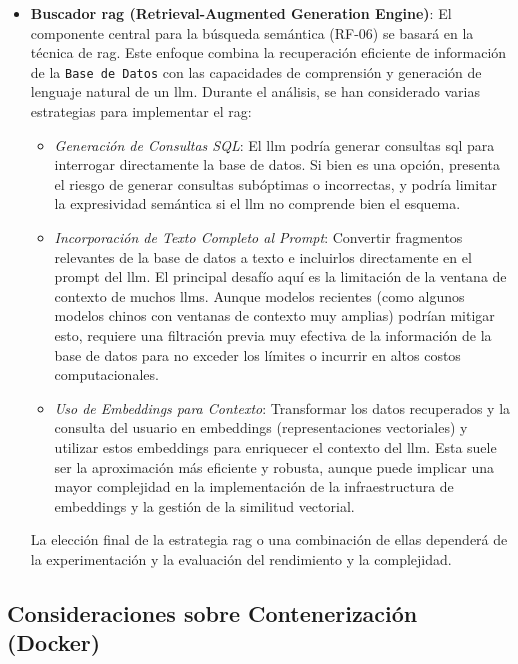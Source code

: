 \begin{itemize}
    \item \textbf{Buscador \gls{rag} (Retrieval-Augmented Generation Engine)}:
    El componente central para la búsqueda semántica (RF-06) se basará en la técnica de \gls{rag}. Este enfoque combina la recuperación eficiente de información de la \texttt{Base de Datos} con las capacidades de comprensión y generación de lenguaje natural de un \gls{llm}. Durante el análisis, se han considerado varias estrategias para implementar el \gls{rag}:
    \begin{itemize}
        \item \textit{Generación de Consultas SQL}: El \gls{llm} podría generar consultas \gls{sql} para interrogar directamente la base de datos. Si bien es una opción, presenta el riesgo de generar consultas subóptimas o incorrectas, y podría limitar la expresividad semántica si el \gls{llm} no comprende bien el esquema.
        \item \textit{Incorporación de Texto Completo al Prompt}: Convertir fragmentos relevantes de la base de datos a texto e incluirlos directamente en el prompt del \gls{llm}. El principal desafío aquí es la limitación de la ventana de contexto de muchos \glspl{llm}. Aunque modelos recientes (como algunos modelos chinos con ventanas de contexto muy amplias) podrían mitigar esto, requiere una filtración previa muy efectiva de la información de la base de datos para no exceder los límites o incurrir en altos costos computacionales.
        \item \textit{Uso de Embeddings para Contexto}: Transformar los datos recuperados y la consulta del usuario en embeddings (representaciones vectoriales) y utilizar estos embeddings para enriquecer el contexto del \gls{llm}. Esta suele ser la aproximación más eficiente y robusta, aunque puede implicar una mayor complejidad en la implementación de la infraestructura de embeddings y la gestión de la similitud vectorial.
    \end{itemize}
    La elección final de la estrategia \gls{rag} o una combinación de ellas dependerá de la experimentación y la evaluación del rendimiento y la complejidad.

\end{itemize}

\subsection{Consideraciones sobre Contenerización (Docker)}
\label{subsec:docker_considerations}

